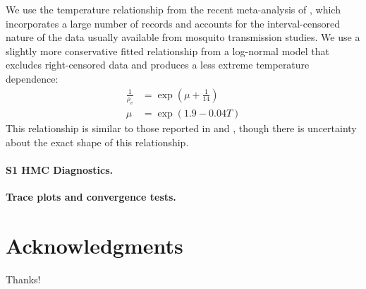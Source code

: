 \documentclass[10pt,letterpaper]{article}
\begin{document}
\begin{itemize}
We use the temperature relationship from the recent meta-analysis of \cite{Chan2012}, which incorporates a large number of records and accounts for the interval-censored nature of the data usually available from mosquito transmission studies.
We use a slightly more conservative fitted relationship from a log-normal model that excludes right-censored data and produces a less extreme temperature dependence:
\begin{align}
\frac{1}{\rho_v} &= \exp \left(\mu + \frac{1}{14}\right)\\
\mu & = \exp(1.9 - 0.04 T)
\end{align}
This relationship is similar to those reported in \cite{Focks1995} and \cite{Tjaden2013}, though there is uncertainty about the exact shape of this relationship.
\end{itemize}

\paragraph*{S1 HMC Diagnostics.}
\label{S1_Diag}
{\bf Trace plots and convergence tests.}

\section*{Acknowledgments}

Thanks!

\nolinenumbers

%
%
% 



\end{document}
